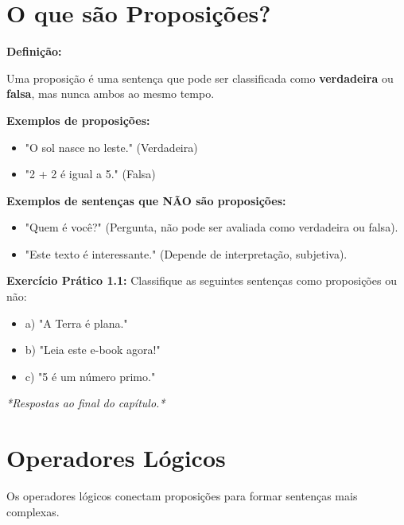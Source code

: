 \documentclass[a4paper,12pt]{book}
\begin{document}
\section{O que são Proposições?}
\textbf{Definição:}

Uma proposição é uma sentença que pode ser classificada como \textbf{verdadeira} ou \textbf{falsa}, mas nunca ambos ao mesmo tempo.

\textbf{Exemplos de proposições:}
\begin{itemize}
    \item "O sol nasce no leste." (Verdadeira)
    \item "2 + 2 é igual a 5." (Falsa)
\end{itemize}

\textbf{Exemplos de sentenças que NÃO são proposições:}
\begin{itemize}
    \item "Quem é você?" (Pergunta, não pode ser avaliada como verdadeira ou falsa).
    \item "Este texto é interessante." (Depende de interpretação, subjetiva).
\end{itemize}

\textbf{Exercício Prático 1.1:} Classifique as seguintes sentenças como proposições ou não:
\begin{itemize}
    \item a) "A Terra é plana."
    \item b) "Leia este e-book agora!"
    \item c) "5 é um número primo."
\end{itemize}
\textit{*Respostas ao final do capítulo.*}

\section{Operadores Lógicos}
Os operadores lógicos conectam proposições para formar sentenças mais complexas.
\end{document}
